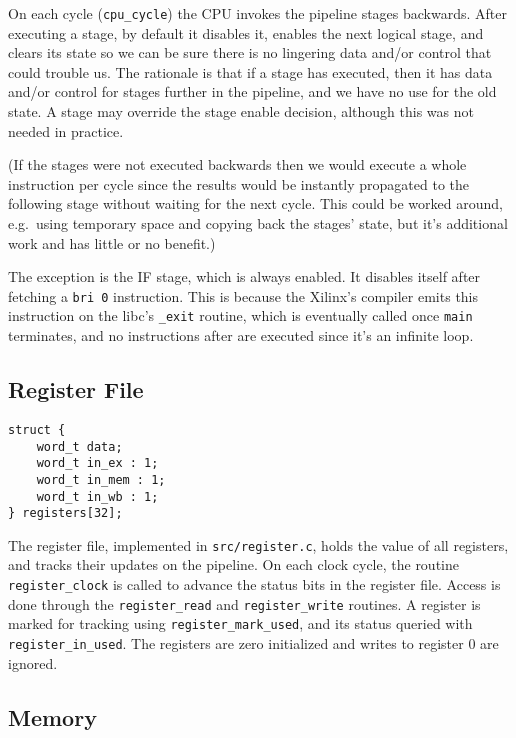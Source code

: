 \documentclass[]{IEEEtran}
\begin{document}
On each cycle (\verb|cpu_cycle|) the CPU invokes the pipeline stages backwards.
After executing a stage, by default it disables it, enables the next logical
stage, and clears its state so we can be sure there is no lingering data and/or
control that could trouble us.  The rationale is that if a stage has executed,
then it has data and/or control for stages further in the pipeline, and we have
no use for the old state. A stage may override the stage enable decision,
although this was not needed in practice.

(If the stages were not executed backwards then we would execute a whole
instruction per cycle since the results would be instantly propagated to the
following stage without waiting for the next cycle. This could be worked around,
e.g.\ using temporary space and copying back the stages' state, but it's
additional work and has little or no benefit.)

The exception is the IF stage, which is always enabled. It disables itself after
fetching a \verb|bri 0| instruction. This is because the Xilinx's compiler emits
this instruction on the libc's \verb|_exit| routine, which is eventually called
once \verb|main| terminates, and no instructions after are executed since it's
an infinite loop.


\subsection{Register File}

\begin{verbatim}
struct {
    word_t data;
    word_t in_ex : 1;
    word_t in_mem : 1;
    word_t in_wb : 1;
} registers[32];
\end{verbatim}

The register file, implemented in \verb|src/register.c|, holds the value of all
registers, and tracks their updates on the pipeline. On each clock cycle, the
routine \verb|register_clock| is called to advance the status bits in the
register file. Access is done through the \verb|register_read| and
\verb|register_write| routines. A register is marked for tracking using
\verb|register_mark_used|, and its status queried with \verb|register_in_used|.
The registers are zero initialized and writes to register 0 are ignored.


\subsection{Memory}
\end{document}
